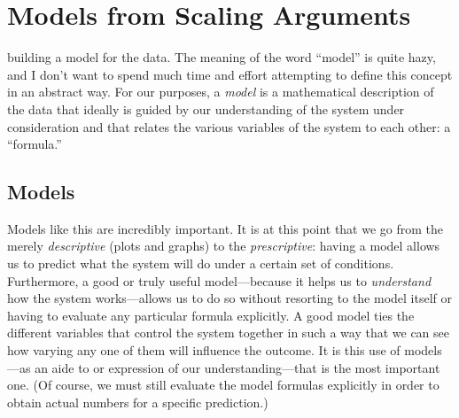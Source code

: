 

\chapter{Models from Scaling Arguments}{}{}
\label{ch:scaling}




 building a model for the data.  The meaning
of the word ``model'' is quite hazy, and I don't want to spend much
time and effort attempting to define this concept in an abstract way.
For our purposes, a \emph{model} is a mathematical description of the
data that ideally is guided by our understanding of the system under
consideration and that relates the various variables of the system to
each other: a ``formula.''

\section{Models}


Models like this are incredibly important. It is at this point that we
go from the merely \emph{descriptive} (plots and graphs) to the
\emph{prescriptive}: having a model allows us to predict what the
system will do under a certain set of conditions. Furthermore, a good
or truly useful model---because it helps us to \emph{understand} how
the system works---allows us to do so without resorting to the model
itself or having to evaluate any particular formula explicitly.  A
good model ties the different variables that control the system
together in such a way that we can see how varying any one of them
will influence the outcome. It is this use of models---as an aide to
or expression of our understanding---that is the most important one.
(Of course, we must still evaluate the model formulas explicitly in
order to obtain actual numbers for a specific prediction.)

